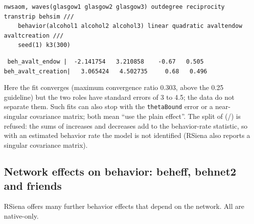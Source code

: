 \begin{lstlisting}
nwsaom, waves(glasgow1 glasgow2 glasgow3) outdegree reciprocity transtrip behsim ///
    behavior(alcohol1 alcohol2 alcohol3) linear quadratic avaltendow avaltcreation ///
    seed(1) k3(300)
\end{lstlisting}
\begin{lstlisting}
 beh_avalt_endow |  -2.141754   3.210858    -0.67   0.505
beh_avalt_creation|   3.065424   4.502735     0.68   0.496
\end{lstlisting}
Here the fit converges (maximum convergence ratio 0.303, above the 0.25 guideline) but the two roles have standard errors of 3 to 4.5; the data do not separate them. Such fits can also stop with the \texttt{thetaBound} error or a near-singular covariance matrix; both mean ``use the plain effect''. The split of  (/) is refused: the sums of increases and decreases add to the behavior-rate statistic, so with an estimated behavior rate the model is not identified (RSiena also reports a singular covariance matrix).

\subsection{Network effects on behavior: beheff, behnet2 and friends}

RSiena offers many further behavior effects that depend on the network. All are native-only.

